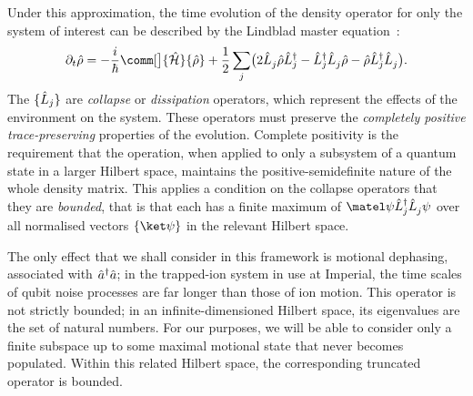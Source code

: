 Under this approximation, the time evolution of the density operator for only the system of interest can be described by the Lindblad master equation~\cite{Manzano2020}:
\begin{equation}\label{eq:qi-lindblad-master}
\partial_t\op\rho = -\frac i\hbar\comm[\big]{\H}{\op\rho} + \frac12\sum_j\bigl(2\op L_j^{}\op\rho\op L_j^{\smash\dagger} - \op L_j^{\smash\dagger}\op L_j^{}\op\rho - \op\rho\op L_j^{\smash\dagger}\op L_j^{}\bigr).
\end{equation}
The $\{\hat{L}_j\}$ are \emph{collapse} or \emph{dissipation} operators, which represent the effects of the environment on the system.
These operators must preserve the \emph{completely positive trace-preserving} properties of the evolution.
Complete positivity is the requirement that the operation, when applied to only a subsystem of a quantum state in a larger Hilbert space, maintains the positive-semidefinite nature of the whole density matrix.
This applies a condition on the collapse operators that they are \emph{bounded}, that is that each has a finite maximum of $\matel\psi{\op L_j^\dagger\op L_j^{}}\psi$ over all normalised vectors $\{\ket\psi\}$ in the relevant Hilbert space.

The only effect that we shall consider in this framework is motional dephasing, associated with $\hat{a}^\dagger\hat{a}$; in the trapped-ion system in use at Imperial, the time scales of qubit noise processes are far longer than those of ion motion.
This operator is not strictly bounded; in an infinite-dimensioned Hilbert space, its eigenvalues are the set of natural numbers.
For our purposes, we will be able to consider only a finite subspace up to some maximal motional state that never becomes populated.
Within this related Hilbert space, the corresponding truncated operator is bounded.
